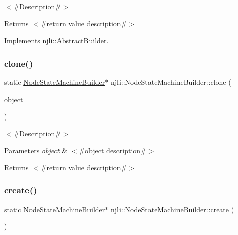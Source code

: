 $<$\#\+Description\#$>$

\begin{DoxyReturn}{Returns}
$<$\#return value description\#$>$ 
\end{DoxyReturn}


Implements \mbox{\hyperlink{classnjli_1_1_abstract_builder_aa1d220053e182c37b31b427499c6eacf}{njli\+::\+Abstract\+Builder}}.

\mbox{\label{classnjli_1_1_node_state_machine_builder_ab5d5c3edf905469d7d5b5388bb06a27d}} 
\subsubsection{\texorpdfstring{clone()}{clone()}}
{\footnotesize\ttfamily static \mbox{\hyperlink{classnjli_1_1_node_state_machine_builder}{Node\+State\+Machine\+Builder}}$\ast$ njli\+::\+Node\+State\+Machine\+Builder\+::clone (\begin{DoxyParamCaption}\item[{const \mbox{\hyperlink{classnjli_1_1_node_state_machine_builder}{Node\+State\+Machine\+Builder}} \&}]{object }\end{DoxyParamCaption})\hspace{0.3cm}{\ttfamily [static]}}

$<$\#\+Description\#$>$


\begin{DoxyParams}{Parameters}
{\em object} & $<$\#object description\#$>$\\
\hline
\end{DoxyParams}
\begin{DoxyReturn}{Returns}
$<$\#return value description\#$>$ 
\end{DoxyReturn}
\mbox{\label{classnjli_1_1_node_state_machine_builder_aea0b3e3e1d48675456383359f82ff9a1}} 
\subsubsection{\texorpdfstring{create()}{create()}}
{\footnotesize\ttfamily static \mbox{\hyperlink{classnjli_1_1_node_state_machine_builder}{Node\+State\+Machine\+Builder}}$\ast$ njli\+::\+Node\+State\+Machine\+Builder\+::create (\begin{DoxyParamCaption}{ }\end{DoxyParamCaption})\hspace{0.3cm}{\ttfamily [static]}}

